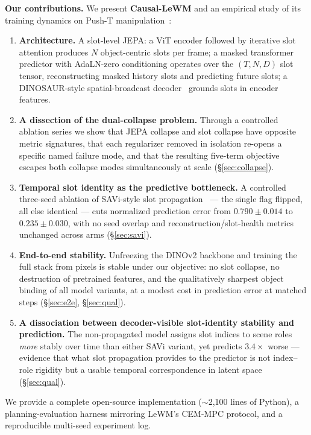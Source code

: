 \documentclass[12pt]{article}
\begin{document}
\textbf{Our contributions.} We present \textbf{Causal-LeWM} and an empirical study of its training dynamics on Push-T manipulation~\citep{chi2023diffusion}:
\begin{enumerate}[label=(\roman*)]
    \item \textbf{Architecture.} A slot-level JEPA: a ViT encoder followed by iterative slot attention produces $N$ object-centric slots per frame; a masked transformer predictor with AdaLN-zero conditioning operates over the $(T, N, D)$ slot tensor, reconstructing masked history slots and predicting future slots; a DINOSAUR-style spatial-broadcast decoder~\citep{seitzer2023dinosaur} grounds slots in encoder features.
    \item \textbf{A dissection of the dual-collapse problem.} Through a controlled ablation series we show that JEPA collapse and slot collapse have opposite metric signatures, that each regularizer removed in isolation re-opens a specific named failure mode, and that the resulting five-term objective escapes both collapse modes simultaneously at scale (\S\ref{sec:collapse}).
    \item \textbf{Temporal slot identity as the predictive bottleneck.} A controlled three-seed ablation of SAVi-style slot propagation~\citep{kipf2021savi} --- the single flag flipped, all else identical --- cuts normalized prediction error from $0.790 \pm 0.014$ to $0.235 \pm 0.030$, with no seed overlap and reconstruction/slot-health metrics unchanged across arms (\S\ref{sec:savi}).
    \item \textbf{End-to-end stability.} Unfreezing the DINOv2 backbone and training the full stack from pixels is stable under our objective: no slot collapse, no destruction of pretrained features, and the qualitatively sharpest object binding of all model variants, at a modest cost in prediction error at matched steps (\S\ref{sec:e2e}, \S\ref{sec:qual}).
    \item \textbf{A dissociation between decoder-visible slot-identity stability and prediction.} The non-propagated model assigns slot indices to scene roles \emph{more} stably over time than either SAVi variant, yet predicts $3.4\times$ worse --- evidence that what slot propagation provides to the predictor is not index--role rigidity but a usable temporal correspondence in latent space (\S\ref{sec:qual}).
\end{enumerate}

We provide a complete open-source implementation ($\sim$2{,}100 lines of Python), a planning-evaluation harness mirroring LeWM's CEM-MPC protocol, and a reproducible multi-seed experiment log.
\end{document}

